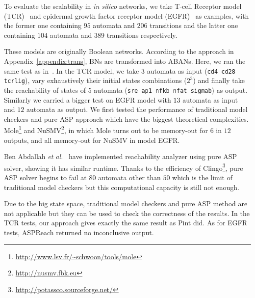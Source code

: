 To evaluate the scalability in \textit{in silico} networks, we take T-cell Receptor model (TCR)~\cite{saez2007logical} and epidermal growth factor receptor model (EGFR)~\cite{samaga2009logic} as examples, with the former one containing $95$ automata and $206$ transitions and the latter one containing $104$ automata and $389$ transitions respectively. 

These models are originally Boolean networks.
According to the approach in Appendix~\ref{appendix:trans}, BNs are transformed into ABANs. 
Here, we ran the same test as in~\cite{folschette2015}. In the TCR model, we take $3$ automata as input (\texttt{cd4 cd28 tcrlig}), vary exhaustively their initial states combinations ($2^3$) and finally take the reachability of states of $5$ automata (\texttt{sre ap1 nfkb nfat sigmab}) as output. 
Similarly we carried a bigger test on EGFR model with $13$ automata %
as input and $12$ automata %
as output.
We first tested the performance of traditional model checkers and pure ASP approach which have the biggest theoretical complexities. 
Mole\footnote{\url{http://www.lsv.fr/~schwoon/tools/mole}} and NuSMV\footnote{\url{http://nusmv.fbk.eu}}, in which Mole turns out to be memory-out for $6$ in $12$ outputs, and all memory-out for NuSMV in model EGFR. 

Ben Abdallah \textit{et al.}~\cite{abdallah2015exhaustive} have implemented reachability analyzer using pure ASP solver, showing it has similar runtime.
Thanks to the efficiency of Clingo\footnote{\url{http://potassco.sourceforge.net/}}, pure ASP solver begins to fail at $80$ automata other than $50$ which is the limit of traditional model checkers but this computational capacity is still not enough.

Due to the big state space, traditional model checkers and pure ASP method are not applicable but they can be used to check the correctness of the results.
In the TCR tests, our approach gives exactly the same result as Pint did. 
As for EGFR tests, ASPReach returned no inconclusive output.

